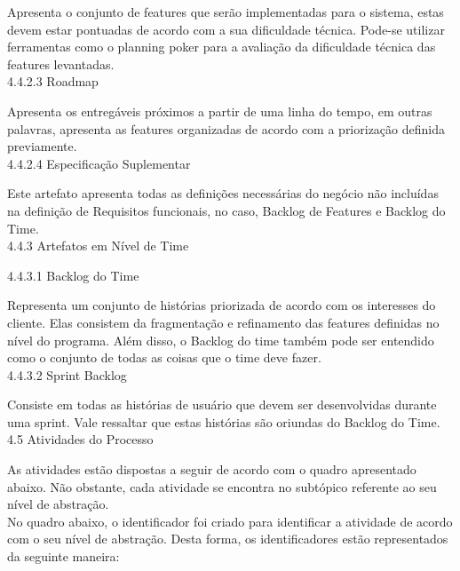 \tab Apresenta o conjunto de features que serão implementadas para o sistema, estas devem estar pontuadas de acordo com a sua dificuldade técnica. Pode-se utilizar ferramentas como o planning poker para a avaliação da dificuldade técnica das features levantadas. \\



{\large{4.4.2.3 Roadmap \\}}

\tab Apresenta os entregáveis próximos a partir de uma linha do tempo, em outras palavras, apresenta as features organizadas de acordo com a priorização definida previamente. \\



{\large{4.4.2.4 Especificação Suplementar\\}}

\tab Este artefato apresenta todas as definições necessárias do negócio não incluídas na definição de Requisitos funcionais, no caso, Backlog de Features e Backlog do Time. \\


{\large{4.4.3 Artefatos em Nível de Time \\}}


{\large{4.4.3.1 Backlog do Time \\}}

\tab Representa um conjunto de histórias priorizada de acordo com os interesses do cliente. Elas consistem da fragmentação e refinamento das features definidas no nível do programa. Além disso, o Backlog do time também pode ser entendido como o conjunto de todas as coisas que o time deve fazer. \\



{\large{4.4.3.2 Sprint Backlog\\}}

\tab Consiste em todas as histórias de usuário que devem ser desenvolvidas durante uma sprint. Vale ressaltar que estas histórias são oriundas do Backlog do Time. \\




{\large{4.5 Atividades do Processo \\}}

\tab As atividades  estão dispostas a seguir de acordo com o quadro apresentado abaixo. Não obstante, cada atividade se encontra no subtópico referente ao seu nível de abstração. \\
\tab No quadro abaixo, o identificador foi criado para identificar a atividade de acordo com o seu nível de abstração. Desta forma, os identificadores estão representados da seguinte maneira: \\

